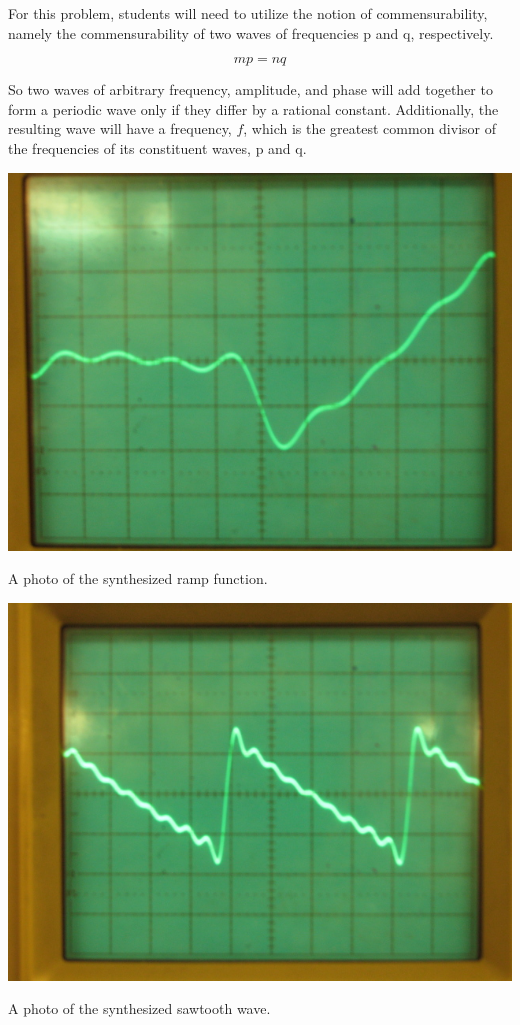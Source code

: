 \begin{enumerate}[resume]
\begin{enumerate}[label=(\Alph*)]
For this problem, students will need to utilize the notion of commensurability, namely the commensurability of two waves of frequencies p and q, respectively.

\begin{equation}
mp=nq
\label{equ:fscg11}
\end{equation}

So two waves of arbitrary frequency, amplitude, and phase will add together to form a periodic wave only if they differ by a rational constant. Additionally, the resulting wave will have a frequency, $f$, which is the greatest common divisor of the frequencies of its constituent waves, p and q.\newline

\begin{marginfigure}
\includegraphics[scale=.85]{FS-ramp-sketch.jpg}
\caption{A photo of the synthesized ramp function.}
\label{fig:fscg10}
\end{marginfigure}



\begin{marginfigure}
\includegraphics[scale=.85]{FS-sawtooth-sketch.jpg}
\caption{A photo of the synthesized sawtooth wave.}
\label{fig:fscg11}
\end{marginfigure}



\end{enumerate}
\end{enumerate}
